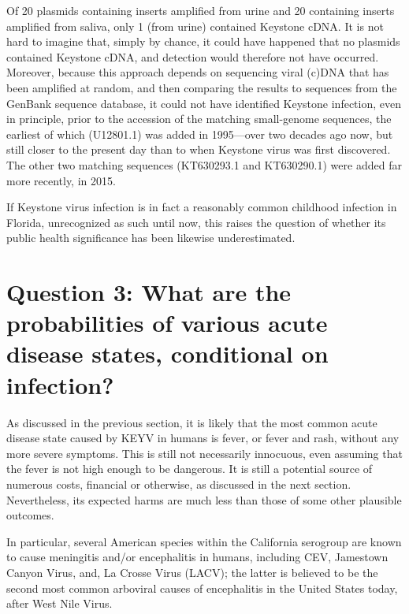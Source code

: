 \documentclass[12pt]{article}
\newcommand{\cjh}{\textcolor{blue}{cjh}}
\newcommand{\msg}[3]{(#1 $\rightarrow$ #2: #3)}
\newcommand{\mcc}[1]{\msg\cjh\cjh{#1}}
\begin{document}
            Of 20 plasmids containing inserts amplified from urine and 20 containing inserts amplified from saliva, only 1 (from urine) contained Keystone cDNA. It is not hard to imagine that, simply by chance, it could have happened that no plasmids contained Keystone cDNA, and detection would therefore not have occurred. Moreover, because this approach depends on sequencing viral (c)DNA that has been amplified at random, and then comparing the results to sequences from the GenBank sequence database, it could not have identified Keystone infection, even in principle, prior to the accession of the matching small-genome sequences, the earliest of which (U12801.1) was added in 1995\cite{genbankU12801.1}---over two decades ago now, but still closer to the present day than to when Keystone virus was first discovered. The other two matching sequences (KT630293.1 and KT630290.1) were added far more recently, in 2015\cite{genbankKT630293.1,genbankKT630290.1}.

            If Keystone virus infection is in fact a reasonably common childhood infection in Florida, unrecognized as such until now, this raises the question of whether its public health significance has been likewise underestimated.


    \section[Probabilities of disease, given infection]{Question 3: What are the probabilities of various acute disease states, conditional on infection?}
        \label{probabilities}
        As discussed in the previous section, it is likely that the most common acute disease state caused by KEYV in humans is fever, or fever and rash, without any more severe symptoms. This is still not necessarily innocuous, even assuming that the fever is not high enough to be dangerous. It is still a potential source of numerous costs, financial or otherwise, as discussed in the next section. Nevertheless, its expected harms are much less than those of some other plausible outcomes.

        In particular, several American species within the California serogroup are known to cause meningitis and/or encephalitis in humans, including CEV, Jamestown Canyon Virus, and, La Crosse Virus (LACV); the latter is believed to be the second most common arboviral causes of encephalitis in the United States today, after West Nile Virus.

\end{document}
